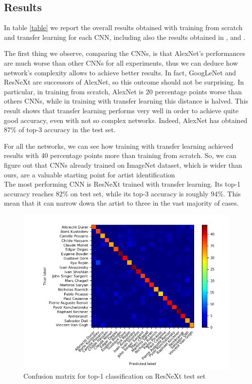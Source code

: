 \documentclass{article}
\begin{document}
\subsection{Results}\label{results}

In table \ref{table} we report the overall results obtained with training  from scratch and transfer learning for each CNN, including also the results obtained in \cite{ArtistIdCNN406}, \cite{Saleh2015} and \cite{mensink2014}.

The first thing we observe, comparing the CNNs, is that AlexNet's performances are much worse than other CNNs for all experiments, thus we can deduce how network's complexity allows to achieve better results. In fact, GoogLeNet and ResNeXt are successors of AlexNet, so this outcome should not be surprising. 
In particular, in training from scratch, AlexNet is 20 percentage points worse than others CNNs, while in training with transfer learning this distance is halved. This result shows that transfer learning performs very well in order to achieve quite good accuracy, even with not so complex networks. Indeed, AlexNet has obtained 87\% of top-3 accuracy in the test set.

For all the networks, we can see how training with transfer learning achieved results with 40 percentage points more than training from scratch. So, we can figure out that CNNs already trained on ImageNet dataset, which is wider than ours,  are a valuable starting point for artist identification\\
The most performing CNN is ResNeXt trained with transfer learning. Its top-1 accuracy reaches 82\% on test set, while its top-3 accuracy is roughly 94\%. This mean that it can narrow down the artist to three in the vast majority of cases.

\begin{figure}[t]
	\centering
	\includegraphics[width=0.8\linewidth]{graphs/confusion}
	\caption{Confusion matrix for top-1 classification on ResNeXt test set}
	\label{fig:confusion}
\end{figure}
\end{document}
